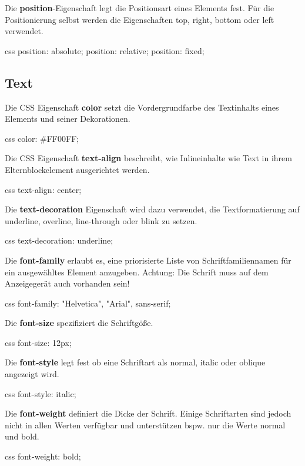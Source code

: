 \documentclass[10pt,a4paper]{article}
\begin{document}
\begin{multicols}{3}
Die \textbf{position}-Eigenschaft legt die Positionsart eines Elements fest. Für die Positionierung selbst werden die Eigenschaften top, right, bottom oder left verwendet.
\begin{codebox}{css}{}
position: absolute;
position: relative;
position: fixed;
\end{codebox}


\subsection*{Text}

Die CSS Eigenschaft \textbf{color} setzt die Vordergrundfarbe des Textinhalts eines Elements und seiner Dekorationen.
\begin{codebox}{css}{}
color: #FF00FF;
\end{codebox}

Die CSS Eigenschaft \textbf{text-align} beschreibt, wie Inlineinhalte wie Text in ihrem Elternblockelement ausgerichtet werden.
\begin{codebox}{css}{}
text-align: center;
\end{codebox}

Die \textbf{text-decoration} Eigenschaft wird dazu verwendet, die Textformatierung auf underline, overline, line-through oder blink zu setzen.
\begin{codebox}{css}{}
text-decoration: underline;
\end{codebox}

Die \textbf{font-family} erlaubt es, eine priorisierte Liste von Schriftfamiliennamen für ein ausgewähltes Element anzugeben. Achtung: Die Schrift muss auf dem Anzeigegerät auch vorhanden sein!
\begin{codebox}{css}{}
font-family: "Helvetica", "Arial", sans-serif;
\end{codebox}

Die \textbf{font-size} spezifiziert die Schriftgöße.
\begin{codebox}{css}{}
font-size: 12px;
\end{codebox}

Die \textbf{font-style} legt fest ob eine Schriftart als normal, italic oder oblique angezeigt wird.
\begin{codebox}{css}{}
font-style: italic;
\end{codebox}

Die \textbf{font-weight} definiert die Dicke der Schrift. Einige Schriftarten sind jedoch nicht in allen Werten verfügbar und unterstützen bspw. nur die Werte normal und bold.
\begin{codebox}{css}{}
font-weight: bold;
\end{codebox}




\printbibliography
{}
\end{multicols}
\end{document}
